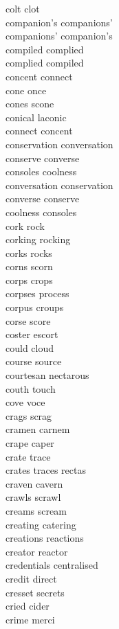 colt clot\\
companion's companions'\\
companions' companion's\\
compiled complied\\
complied compiled\\
concent connect\\
cone once\\
cones scone\\
conical laconic\\
connect concent\\
conservation conversation\\
conserve converse\\
consoles coolness\\
conversation conservation\\
converse conserve\\
coolness consoles\\
cork rock\\
corking rocking\\
corks rocks\\
corns scorn\\
corps crops\\
corpses process\\
corpus croups\\
corse score\\
coster escort\\
could cloud\\
course source\\
courtesan nectarous\\
couth touch\\
cove voce\\
crags scrag\\
cramen carnem\\
crape caper\\
crate trace\\
crates traces rectas\\
craven cavern\\
crawls scrawl\\
creams scream\\
creating catering\\
creations reactions\\
creator reactor\\
credentials centralised\\
credit direct\\
cresset secrets\\
cried cider\\
crime merci\\
